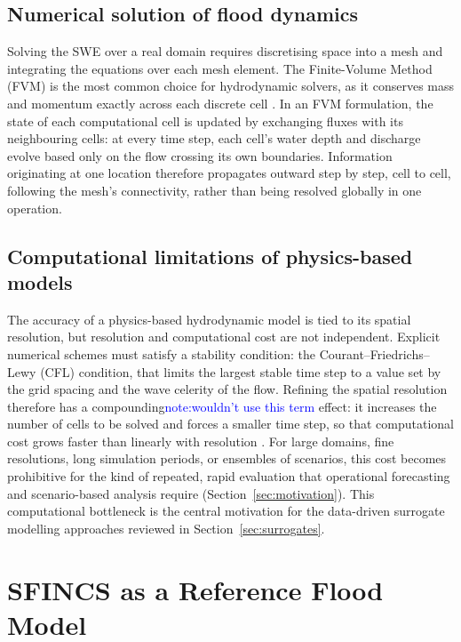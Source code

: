 \documentclass[12pt,a4paper]{report}
\begin{document}
 
\subsection{Numerical solution of flood dynamics}
\label{subsec:num_solutions}
 
Solving the SWE over a real domain requires discretising space into a mesh and integrating the equations over each mesh element.
The Finite-Volume Method (FVM) is
the most common choice for hydrodynamic solvers, as it conserves mass and momentum
exactly across each discrete cell \citep{toro2001shock}
. In an FVM
formulation, the state of each computational cell is updated by exchanging fluxes with
its neighbouring cells: at every time step, each cell's water depth and discharge evolve
based only on the flow crossing its own boundaries. Information originating at one
location therefore propagates outward step by step, cell to cell, following the mesh's
connectivity, rather than being resolved globally in one operation.


\subsection{Computational limitations of physics-based models}
\label{subsec:limitations_physicbased}

The accuracy of a physics-based hydrodynamic model is tied to its spatial resolution,
but resolution and computational cost are not independent. Explicit numerical schemes
must satisfy a stability condition: the Courant--Friedrichs--Lewy (CFL) condition,
that limits the largest stable time step to a value set by the grid spacing and the
wave celerity of the flow. Refining the spatial resolution therefore has a compounding\textcolor{blue}{note:wouldn't use this term}
effect: it increases the number of cells to be solved and forces a smaller time
step, so that computational cost grows faster than linearly with resolution
\citep{toro2001shock,bates2010simple}. For large domains, fine
resolutions, long simulation periods, or ensembles of scenarios, this cost becomes
prohibitive for the kind of repeated, rapid evaluation that operational forecasting and
scenario-based analysis require (Section~\ref{sec:motivation}). This
computational bottleneck is the central motivation for the data-driven surrogate
modelling approaches reviewed in Section~\ref{sec:surrogates}.

\section{SFINCS as a Reference Flood Model}
\label{sec:sfincs_reference}
\end{document}
